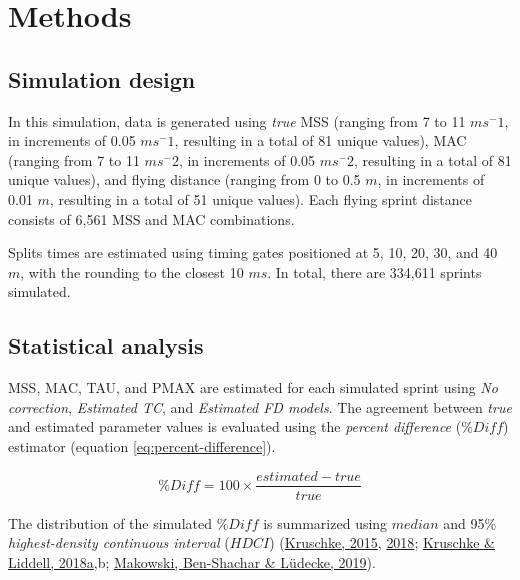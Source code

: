 \documentclass[fleqn,10pt]{wlpeerj} %
\begin{document}
\hypertarget{methods}{%
\section{Methods}\label{methods}}

\hypertarget{simulation-design}{%
\subsection{Simulation design}\label{simulation-design}}

In this simulation, data is generated using \emph{true} MSS (ranging from 7 to 11 \(ms^-1\), in increments of 0.05 \(ms^-1\), resulting in a total of 81 unique values), MAC (ranging from 7 to 11 \(ms^-2\), in increments of 0.05 \(ms^-2\), resulting in a total of 81 unique values), and flying distance (ranging from 0 to 0.5 \(m\), in increments of 0.01 \(m\), resulting in a total of 51 unique values). Each flying sprint distance consists of 6,561 MSS and MAC combinations.

Splits times are estimated using timing gates positioned at 5, 10, 20, 30, and 40 \(m\), with the rounding to the closest 10 \(ms\). In total, there are 334,611 sprints simulated.

\hypertarget{statistical-analysis}{%
\subsection{Statistical analysis}\label{statistical-analysis}}

MSS, MAC, TAU, and PMAX are estimated for each simulated sprint using \emph{No correction}, \emph{Estimated TC}, and \emph{Estimated FD models}. The agreement between \emph{true} and estimated parameter values is evaluated using the \emph{percent difference} (\(\%Diff\)) estimator (equation \eqref{eq:percent-difference}).

\begin{equation}
  \%Diff = 100 \times \frac{estimated - true}{true}  \label{eq:percent-difference}
\end{equation}

The distribution of the simulated \(\%Diff\) is summarized using \(median\) and 95\% \emph{highest-density continuous interval} (\(HDCI\)) (\protect\hyperlink{ref-kruschkeDoingBayesianData2015}{Kruschke, 2015}, \protect\hyperlink{ref-kruschkeRejectingAcceptingParameter2018}{2018}; \protect\hyperlink{ref-kruschkeBayesianDataAnalysis2018}{Kruschke \& Liddell, 2018a},b; \protect\hyperlink{ref-makowskiBayestestRDescribingEffects2019}{Makowski, Ben-Shachar \& Lüdecke, 2019}).
\end{document}
